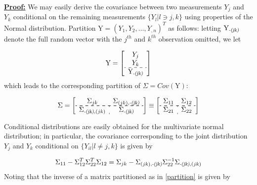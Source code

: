 \documentclass[12pt]{article}
\newcommand{\bigY}{\mbox{Y}}
\begin{document}
\underline{\bf Proof:} We may easily derive the covariance between two measurements $Y_{j}$ and $Y_{k}$ conditional on the remaining measurements $\lbrace Y_{l} \vert l\ni j,k \rbrace$ using properties of the Normal distribution. Partition $\bigY = \left(Y_{1},Y_{2},\dots,Y_{,n}\right)^T$ as follows: letting $\bigY_{{\relsize{-2}{\textsl{-(jk)}}}}$ denote the full random vector with the $j^{th}$ and $k^{th}$ observation omitted, we let

\[
\bigY = \left[ \begin{array}{c}  Y_{j}\\ Y_{k}\\ \hdashline \bigY_{{\relsize{-2}{\textsl{-(jk)}}}} \end{array}\right]
\]
\noindent
which leads to the corresponding partition of $\Sigma = Cov\left(\bigY\right)$:

\begin{equation}
\Sigma = \left[\begin{array}{c:c}  \Sigma_{jk} &  \Sigma_{{\relsize{-2}{(jk),\textsl{-(jk)}}}} \\ \cdashline{1-2}  \hdashline \Sigma_{{\relsize{-2}{\textsl{-(jk)}},(jk)}}  & \Sigma_{{\relsize{-2}{\textsl{-(jk)}}}}   \end{array}\right] \equiv \left[\begin{array}{c:c} \Sigma_{11} & \Sigma_{12}  \\ \cdashline{1-2}  \hdashline \Sigma_{21} & \Sigma_{22}  \end{array}\right] \label{partition}
\end{equation}

Conditional distributions are easily obtained for the multivariate normal distribution; in particular, the covariance corresponding to the joint distribution $Y_{j}$ and $Y_{k}$ conditional on $\lbrace Y_{il} \vert l \ne j,k \rbrace$ is given by 

\begin{equation}
\Sigma_{11} - \Sigma_{12}^T\Sigma_{22}^T\Sigma_{12} = \Sigma_{jk} - \Sigma_{{\relsize{-2}{(jk),\textsl{-(jk)}}}}\Sigma_{22}^{-1}\Sigma_{{\relsize{-2}{\textsl{-(jk)}},(jk)}} \label{condcov}
\end{equation}
\noindent
Noting that the inverse of a matrix partitioned as in \eqref{partition} is given by 
\end{document}
